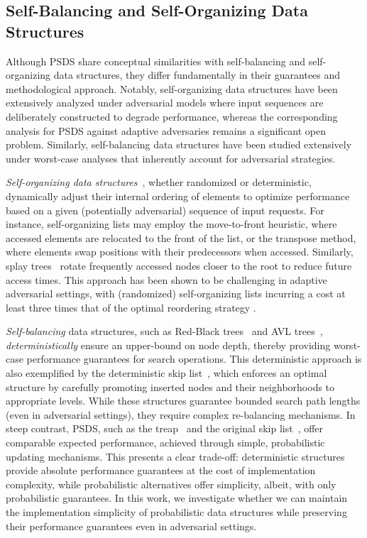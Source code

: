 \subsection{Self-Balancing and Self-Organizing Data Structures}

Although PSDS share conceptual similarities with self-balancing and self-organizing data structures, they differ fundamentally in their guarantees and methodological approach. 
Notably, self-organizing data structures have been extensively analyzed under adversarial models where input sequences are deliberately constructed to degrade performance, whereas the corresponding analysis for PSDS against adaptive adversaries remains a significant open problem. Similarly, self-balancing data structures have been studied extensively under worst-case analyses that inherently account for adversarial strategies.

\emph{Self-organizing data structures}~\cite{albers2005self}, whether randomized or deterministic, dynamically adjust their internal ordering of elements to optimize performance based on a given (potentially adversarial) sequence of input requests. For instance, self-organizing lists may employ the move-to-front heuristic, where accessed elements are relocated to the front of the list, or the transpose method, where elements swap positions with their predecessors when accessed. Similarly, splay trees~\cite{sleator1985self} rotate frequently accessed nodes closer to the root to reduce future access times. This approach has been shown to be challenging in adaptive adversarial settings, with (randomized) self-organizing lists incurring a cost at least three times that of the optimal reordering strategy \cite{reingold1994randomized}. 

\emph{Self-balancing} data structures, such as Red-Black trees~\cite{bayer1972symmetric} and AVL trees~\cite{adel1962algorithm}, \emph{deterministically} ensure an upper-bound on node depth, thereby providing worst-case performance guarantees for search operations. This deterministic approach is also exemplified by the deterministic skip list~\cite{munro1992deterministic}, which enforces an optimal structure by carefully promoting inserted nodes and their neighborhoods to appropriate levels. While these structures guarantee bounded search path lengths (even in adversarial settings), they require complex re-balancing mechanisms. In steep contrast, PSDS, such as the treap~\cite{seidel1996randomized} and the original skip list~\cite{pugh}, offer comparable expected performance, achieved through simple, probabilistic updating mechanisms. This presents a clear trade-off: deterministic structures provide absolute performance guarantees at the cost of implementation complexity, while probabilistic alternatives offer simplicity, albeit, with only probabilistic guarantees. In this work, we investigate whether we can maintain the implementation simplicity of probabilistic data structures while preserving their performance guarantees even in adversarial settings.

